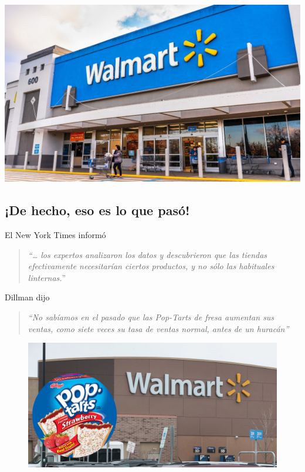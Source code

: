 \documentclass[
  letterpaper,
  DIV=11,
  numbers=noendperiod]{scrartcl}
\begin{document}
\includegraphics[width=5.375in,height=\textheight]{images/clipboard-4213549697.png}

\hypertarget{de-hecho-eso-es-lo-que-pasuxf3}{%
\subsection{¡De hecho, eso es lo que
pasó!}\label{de-hecho-eso-es-lo-que-pasuxf3}}

El New York Times informó

\begin{quote}
\emph{``\ldots{} los expertos analizaron los datos y descubrieron que
las tiendas efectivamente necesitarían ciertos productos, y no sólo las
habituales linternas.}''
\end{quote}

Dillman dijo

\begin{quote}
\emph{``No sabíamos en el pasado que las Pop-Tarts de fresa aumentan sus
ventas, como siete veces su tasa de ventas normal, antes de un
huracán''}
\end{quote}

\begin{figure}

{\centering 

\href{https://www.nytimes.com/2004/11/14/business/yourmoney/what-walmart-knows-about-customers-habits.html}{\includegraphics[width=5.51042in,height=\textheight]{images/clipboard-3670330051.png}}

}

\end{figure}
\end{document}
